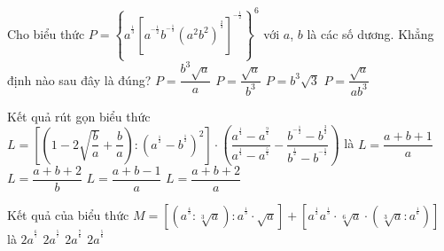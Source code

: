 \begin{ex}%
	Cho biểu thức $P=\left\{a^{^{\tfrac{1}{3}}}\left[a^{^{-\tfrac{1}{2}}} b^{^{-\tfrac{1}{3}}}\left(a^2b^2\right)^{^{\tfrac{2}{3}}}\right]^{^{-\tfrac{1}{2}}}\right\}^6$ với $a$, $b$ là các số dương. Khẳng định nào sau đây là đúng?
	\choice
	{$P=\dfrac{b^3\sqrt {a}}{a}$}
	{$P=\dfrac{\sqrt {a}}{b^3}$}
	{$P=b^3\sqrt {3}$}
	{\True $P=\dfrac{\sqrt {a}}{ab^3}$ }
\end{ex}
\begin{ex}%
	Kết quả rút gọn biểu thức $L=\left [\left (1-2\sqrt{\dfrac{b}{a}}+\dfrac{b}{a}\right ): \left (a^{^{\tfrac{1}{2}}}-b^{^{\tfrac{1}{2}}}\right )^2\right ] \cdot \left (\dfrac{a^{^{\tfrac{1}{4}}}-a^{^{\tfrac{9}{4}}}}{a^{^{\tfrac{1}{4}}}-a^{^{\tfrac{5}{4}}}}-\dfrac{b^{^{-\tfrac{1}{2}}}-b^{^{\tfrac{3}{2}}}}{b^{^{\tfrac{1}{2}}}-b^{^{-\tfrac{1}{2}}}}\right )$ là
	\choice
	{$L=\dfrac{a+b+1}{a}$}
	{$L=\dfrac{a+b+2}{b}$}
	{$L=\dfrac{a+b-1}{a}$}
	{\True $L=\dfrac{a+b+2}{a}$}
\end{ex}
\begin{ex}%
	Kết quả của biểu thức $M=\left [\left (a^{^{\tfrac{4}{3}}}: \sqrt[3]{a}\right ) : a^{^{\tfrac{1}{3}}} \cdot \sqrt{a}\right ] + \left [ a^{^{\tfrac{1}{2}}}a^{^{\tfrac{1}{3}}}\cdot \sqrt[6]{a}\cdot \left (\sqrt[3]{a} : a^{^{\tfrac{1}{6}}}\right )\right ]$ là
	\choice
	{$2a^{^{\tfrac{6}{7}}}$}
	{$2a^{^{\tfrac{5}{7}}}$}
	{\True $2a^{^{\tfrac{7}{6}}}$}
	{$2a^{^{\tfrac{5}{6}}}$}
\end{ex}
